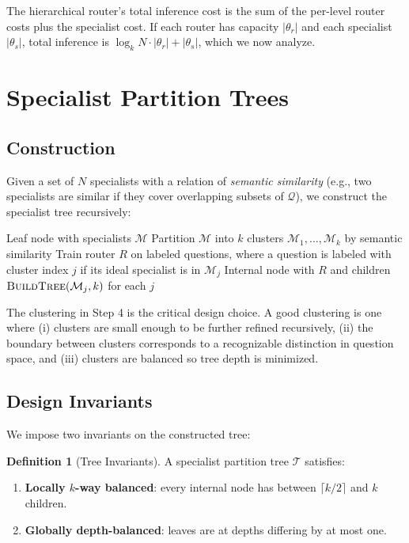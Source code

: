 \documentclass[11pt,a4paper]{article}
\theoremstyle{definition}
\newtheorem{definition}[theorem]{Definition}
\theoremstyle{remark}
\newcommand{\Qc}{\mathcal{Q}}
\newcommand{\Tc}{\mathcal{T}}
\newcommand{\Mc}{\mathcal{M}}
\begin{document}
The hierarchical router's total inference cost is the sum of the per-level router costs plus the specialist cost. If each router has capacity $|\theta_r|$ and each specialist $|\theta_s|$, total inference is $\log_k N \cdot |\theta_r| + |\theta_s|$, which we now analyze.

\section{Specialist Partition Trees}
\label{sec:tree}

\subsection{Construction}

Given a set of $N$ specialists with a relation of \emph{semantic similarity} (e.g., two specialists are similar if they cover overlapping subsets of $\Qc$), we construct the specialist tree recursively:

\begin{algorithm}
\caption{Build Specialist Tree}
\label{alg:build}
\begin{algorithmic}[1]
\Function{BuildTree}{$\Mc$, $k$}
    \If{$|\Mc| \leq k$}
        \State \Return Leaf node with specialists $\Mc$
    \EndIf
    \State Partition $\Mc$ into $k$ clusters $\Mc_1, \ldots, \Mc_k$ by semantic similarity
    \State Train router $R$ on labeled questions, where a question is labeled with cluster index $j$ if its ideal specialist is in $\Mc_j$
    \State \Return Internal node with $R$ and children $\Call{BuildTree}{\Mc_j, k}$ for each $j$
\EndFunction
\end{algorithmic}
\end{algorithm}

The clustering in Step 4 is the critical design choice. A good clustering is one where (i) clusters are small enough to be further refined recursively, (ii) the boundary between clusters corresponds to a recognizable distinction in question space, and (iii) clusters are balanced so tree depth is minimized.

\subsection{Design Invariants}

We impose two invariants on the constructed tree:

\begin{definition}[Tree Invariants]
\label{def:invariants}
A specialist partition tree $\Tc$ satisfies:
\begin{enumerate}
    \item \textbf{Locally $k$-way balanced}: every internal node has between $\lceil k/2 \rceil$ and $k$ children.
    \item \textbf{Globally depth-balanced}: leaves are at depths differing by at most one.
\end{enumerate}
\end{definition}
\end{document}
